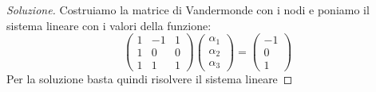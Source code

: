 \documentclass[11pt,a4paper,twoside]{article}
\theoremstyle{definition}
\newenvironment{sol}
	{\renewcommand\qedsymbol{$\blacksquare$}\begin{proof}[Soluzione]}
	{\end{proof}}
\begin{document}
\begin{sol}
	 Costruiamo la matrice di Vandermonde con i nodi e poniamo il sistema lineare con i valori della funzione:
	\[
		\begin{pmatrix}
			1 & -1 & 1\\
			1 & 0 & 0\\
			1 & 1 & 1
		\end{pmatrix}
		\begin{pmatrix}
			\alpha_1 \\ \alpha_2 \\ \alpha_3
		\end{pmatrix} =
		\begin{pmatrix}
			-1\\ 0\\ 1
		\end{pmatrix}
	\]
	Per la soluzione basta quindi risolvere il sistema lineare


\end{sol}
\end{document}
